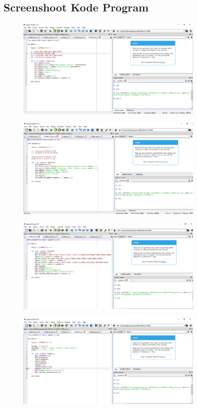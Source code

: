 \subsection{Screenshoot Kode Program}
\begin{figure}[H]
	\includegraphics[width=9cm]{figures/6/1174089/Praktek/c1.png}
	\centering
\end{figure}
\begin{figure}[H]
	\includegraphics[width=9cm]{figures/6/1174089/Praktek/c2.png}
	\centering
\end{figure}
\begin{figure}[H]
	\includegraphics[width=9cm]{figures/6/1174089/Praktek/c3.png}
	\centering
\end{figure}
\begin{figure}[H]
	\includegraphics[width=9cm]{figures/6/1174089/Praktek/c4.png}
	\centering
\end{figure}
